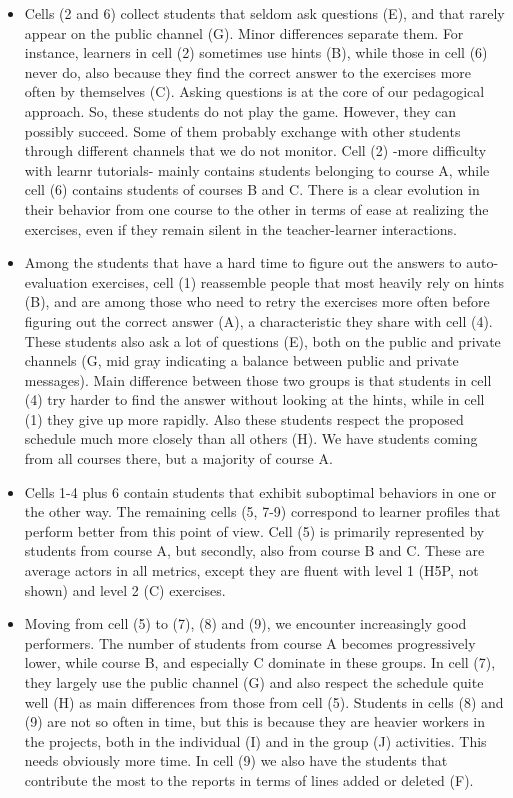 \documentclass{aims}
\theoremstyle{definition}
\begin{document}
\begin{itemize}
\item
  Cells (2 and 6) collect students that seldom ask questions (E), and
  that rarely appear on the public channel (G). Minor differences
  separate them. For instance, learners in cell (2) sometimes use hints
  (B), while those in cell (6) never do, also because they find the
  correct answer to the exercises more often by themselves (C). Asking
  questions is at the core of our pedagogical approach. So, these
  students do not play the game. However, they can possibly succeed.
  Some of them probably exchange with other students through different
  channels that we do not monitor. Cell (2) -more difficulty with learnr
  tutorials- mainly contains students belonging to course A, while cell
  (6) contains students of courses B and C. There is a clear evolution
  in their behavior from one course to the other in terms of ease at
  realizing the exercises, even if they remain silent in the
  teacher-learner interactions.
\item
  Among the students that have a hard time to figure out the answers to
  auto-evaluation exercises, cell (1) reassemble people that most
  heavily rely on hints (B), and are among those who need to retry the
  exercises more often before figuring out the correct answer (A), a
  characteristic they share with cell (4). These students also ask a lot
  of questions (E), both on the public and private channels (G, mid gray
  indicating a balance between public and private messages). Main
  difference between those two groups is that students in cell (4) try
  harder to find the answer without looking at the hints, while in cell
  (1) they give up more rapidly. Also these students respect the
  proposed schedule much more closely than all others (H). We have
  students coming from all courses there, but a majority of course A.
\item
  Cells 1-4 plus 6 contain students that exhibit suboptimal behaviors in
  one or the other way. The remaining cells (5, 7-9) correspond to
  learner profiles that perform better from this point of view. Cell (5)
  is primarily represented by students from course A, but secondly, also
  from course B and C. These are average actors in all metrics, except
  they are fluent with level 1 (H5P, not shown) and level 2 (C)
  exercises.
\item
  Moving from cell (5) to (7), (8) and (9), we encounter increasingly
  good performers. The number of students from course A becomes
  progressively lower, while course B, and especially C dominate in
  these groups. In cell (7), they largely use the public channel (G) and
  also respect the schedule quite well (H) as main differences from
  those from cell (5). Students in cells (8) and (9) are not so often in
  time, but this is because they are heavier workers in the projects,
  both in the individual (I) and in the group (J) activities. This needs
  obviously more time. In cell (9) we also have the students that
  contribute the most to the reports in terms of lines added or deleted
  (F).
\end{itemize}
\end{document}
